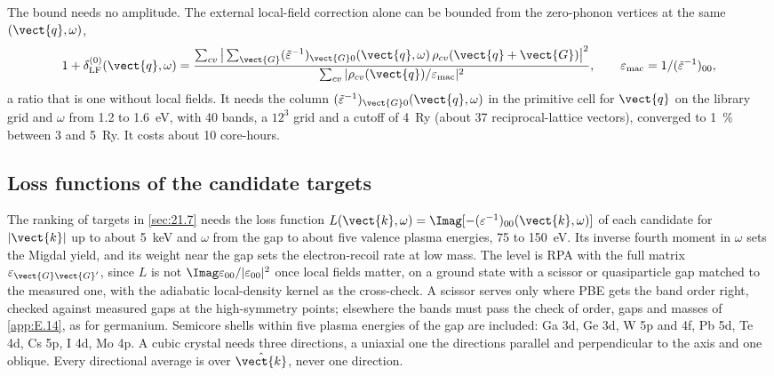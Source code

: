 The bound needs no amplitude. The external local-field correction alone can be bounded from the zero-phonon vertices at the same $(\vect{q},\omega)$,
\begin{equation}
  1 + \delta_{\mathrm{LF}}^{(0)}(\vect{q},\omega) = \frac{\sum_{cv}\big|\sum_{\vect{G}}(\tilde\varepsilon^{-1})_{\vect{G}0}(\vect{q},\omega)\,\rho_{cv}(\vect{q}+\vect{G})\big|^2}{\sum_{cv}|\rho_{cv}(\vect{q})/\varepsilon_{\mathrm{mac}}|^2} , \qquad \varepsilon_{\mathrm{mac}} = 1/(\tilde\varepsilon^{-1})_{00} ,
  \label{eq:E.16-dLF}
\end{equation}
a ratio that is one without local fields. It needs the column $(\tilde\varepsilon^{-1})_{\vect{G}0}(\vect{q},\omega)$ in the primitive cell for $\vect{q}$ on the library grid and $\omega$ from 1.2 to \SI{1.6}{eV}, with 40 bands, a $12^3$ grid and a cutoff of \SI{4}{Ry} (about 37 reciprocal-lattice vectors), converged to \SI{1}{\percent} between 3 and \SI{5}{Ry}. It costs about 10 core-hours.

\subsection{Loss functions of the candidate targets}

The ranking of targets in \cref{sec:21.7} needs the loss function $L(\vect{k},\omega) = \Imag[-(\varepsilon^{-1})_{00}(\vect{k},\omega)]$ of each candidate for $|\vect{k}|$ up to about \SI{5}{keV} and $\omega$ from the gap to about five valence plasma energies, 75 to \SI{150}{eV}. Its inverse fourth moment in $\omega$ sets the Migdal yield, and its weight near the gap sets the electron-recoil rate at low mass. The level is RPA with the full matrix $\varepsilon_{\vect{G}\vect{G}'}$, since $L$ is not $\Imag\varepsilon_{00}/|\varepsilon_{00}|^2$ once local fields matter, on a ground state with a scissor or quasiparticle gap matched to the measured one, with the adiabatic local-density kernel as the cross-check. A scissor serves only where PBE gets the band order right, checked against measured gaps at the high-symmetry points; elsewhere the bands must pass the check of order, gaps and masses of \cref{app:E.14}, as for germanium. Semicore shells within five plasma energies of the gap are included: Ga 3d, Ge 3d, W 5p and 4f, Pb 5d, Te 4d, Cs 5p, I 4d, Mo 4p. A cubic crystal needs three directions, a uniaxial one the directions parallel and perpendicular to the axis and one oblique. Every directional average is over $\hat{\vect{k}}$, never one direction.

